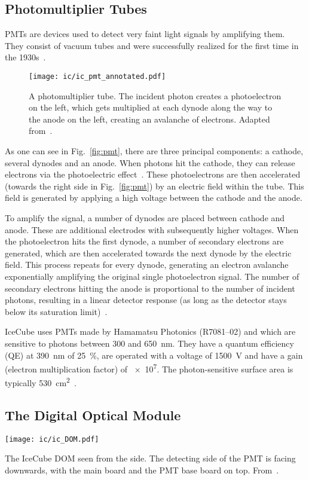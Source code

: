 \subsection{Photomultiplier Tubes}
PMTs are devices used to detect very faint light signals by amplifying them. They consist of vacuum tubes and were successfully realized for the first time in the 1930s~.

\begin{figure}[h!]
    \texttt{[image: ic/ic\_pmt\_annotated.pdf]}
    \caption[PMT schematic]{A photomultiplier tube. The incident photon creates a photoelectron on the left, which gets multiplied at each dynode along the way to the anode on the left, creating an avalanche of electrons. Adapted from~\cite{Bednarski2014}.}
\end{figure}

As one can see in Fig.~\ref{fig:pmt}, there are three principal components: a cathode, several dynodes and an anode. When photons hit the cathode, they can release electrons via the photoelectric effect~. These photoelectrons are then accelerated (towards the right side in Fig.~\ref{fig:pmt}) by an electric field within the tube. This field is generated by applying a high voltage between the cathode and the anode.

To amplify the signal, a number of dynodes are placed between cathode and anode. These are additional electrodes with subsequently higher voltages. When the photoelectron hits the first dynode, a number of secondary electrons are generated, which are then accelerated towards the next dynode by the electric field. This process repeats for every dynode, generating an electron avalanche exponentially amplifying the original single photoelectron signal. The number of secondary electrons hitting the anode is proportional to the number of incident photons, resulting in a linear detector response (as long as the detector stays below its saturation limit)~.

IceCube uses PMTs made by Hamamatsu Photonics (R7081--02) and which are sensitive to photons between 300 and \SI{650}{\nm}. They have a quantum efficiency (QE) at \SI{390}{\nm} of \SI{25}{\percent}, are operated with a voltage of \SI{1500}{\V} and have a gain (electron multiplication factor) of \num{e7}. The photon-sensitive surface area is typically \SI{530}{\cm\squared}~.

\subsection{The Digital Optical Module}\label{DOM}
\begin{marginfigure}
    \texttt{[image: ic/ic\_DOM.pdf]}
    \caption[IceCube digital optical module]{The IceCube DOM seen from the side. The detecting side of the PMT is facing downwards, with the main board and the PMT base board on top. From~\cite{Aartsen2017}.}
\end{marginfigure}

